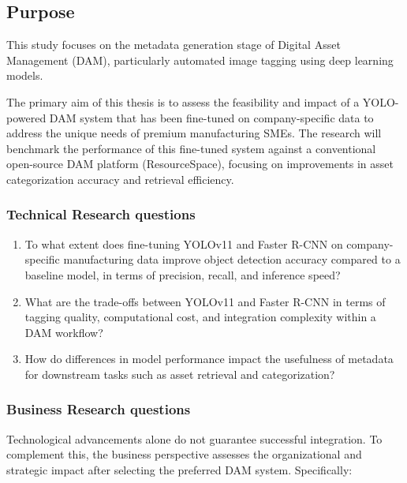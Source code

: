 \documentclass[a4paper,10pt,twocolumn]{article}
\numberwithin{figure}{section}
\numberwithin{table}{section}
\begin{document}
\subsection{Purpose}
This study focuses on the metadata generation stage of Digital Asset Management 
(DAM), particularly automated image tagging using deep learning models.

The primary aim of this thesis is to assess the feasibility and impact of a YOLO-powered DAM system 
that has been fine-tuned on company-specific data to address the unique needs of premium manufacturing SMEs. 
The research will benchmark the performance of this fine-tuned system against a conventional open-source DAM 
platform (ResourceSpace), focusing on improvements in asset categorization accuracy
and retrieval efficiency. 

\vspace{0.3cm}
\subsubsection{Technical Research questions}
\vspace{0.3cm}

\begin{enumerate}[label=(\alph*)]
    \item To what extent does fine-tuning YOLOv11 and 
    Faster R-CNN on company-specific manufacturing data 
    improve object detection accuracy compared to a 
    baseline model, in terms of precision, recall, 
    and inference speed?

    \item What are the trade-offs between YOLOv11 and 
    Faster R-CNN in terms of tagging quality, computational
    cost, and integration complexity within a DAM workflow?
    
    \item How do differences in model performance impact the 
    usefulness of metadata for downstream tasks such as asset 
    retrieval and categorization?

\end{enumerate}

\subsubsection{Business Research questions}
\vspace{0.3cm}
Technological advancements alone do not guarantee successful integration. To complement this,
the business perspective assesses the organizational and strategic impact after selecting the preferred DAM system. Specifically:
\end{document}
